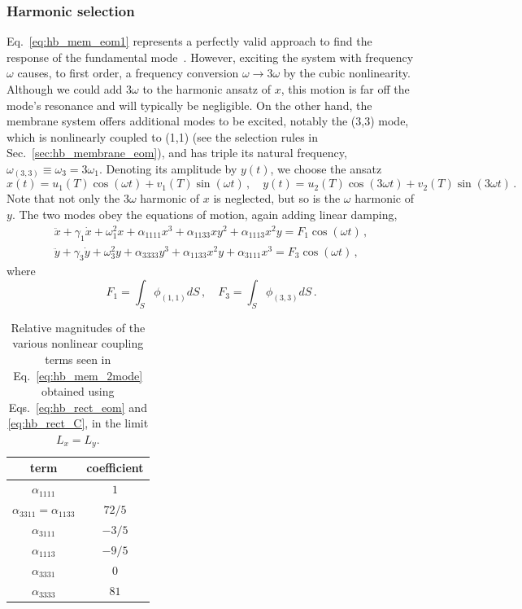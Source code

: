 \subsubsection{Harmonic selection}

Eq.~\eqref{eq:hb_mem_eom1} represents a perfectly valid approach to find the response of the fundamental mode~\cite{Steeneken_2021, Miller_2021}. However, exciting the system with frequency $\omega$ causes, to first order, a frequency conversion $\omega \rightarrow 3\omega$ by the cubic nonlinearity. Although we could add $3\omega $ to the harmonic ansatz of $x$, this motion is far off the mode's resonance and will typically be negligible. On the other hand, the membrane system offers additional modes to be excited, notably the (3,3) mode, which is nonlinearly coupled to (1,1) (see the selection rules in Sec.~\ref{sec:hb_membrane_eom}), and has triple its natural frequency, $\omega_{(3,3)} \equiv \omega_3 = 3 \omega_1$. Denoting its amplitude by $y(t)$, we choose the ansatz
\begin{equation} \label{eq:hb_1133_ansatz}
x(t) = u_1(T) \cos(\omega t) + v_1(T) \sin(\omega t) \,, \quad y(t) = u_2(T) \cos(3\omega t) + v_2(T) \sin(3\omega t) \,.
\end{equation}
Note that not only the $3\omega$ harmonic of $x$ is neglected, but so is the $\omega$ harmonic of $y$. The two modes obey the equations of motion, again adding linear damping,
\begin{equation} \label{eq:hb_mem_2mode}
\begin{gathered}
\ddot{x} + \gamma_1 \dot{x} + \omega_1^2 x + \alpha_{1111} x^3 + \alpha_{1133} x y^2 + \alpha_{1113} x^2 y = F_1 \cos(\omega t)\,, \\
\ddot{y} + \gamma_3 \dot{y} + \omega_3^2 y + \alpha_{3333} y^3 + \alpha_{1133} x^2 y + \alpha_{3111} x^3 = F_3 \cos(\omega t)\,,
\end{gathered} 
\end{equation}
where
\begin{equation}
F_1 = \int_S \phi_{(1,1)} dS\,, \quad F_3 = \int_S \phi_{(3,3)} dS \,.
\end{equation}
\begin{table}[ht] 
	\centering
	\caption{Relative magnitudes of the various nonlinear coupling terms seen in Eq.~\eqref{eq:hb_mem_2mode} obtained using Eqs.~\eqref{eq:hb_rect_eom} and \eqref{eq:hb_rect_C}, in the limit $L_x = L_y$.}
	\label{table:hb_rect_coeffs}
	\begin{tabular}{ |c|c| } 
		\hline
		term & coefficient \\ \hline
		$\alpha_{1111}$	& $1$ \\
		$\alpha_{3311} = \alpha_{1133}$ & $72/5$\\ 
		$\alpha_{3111}$ & $-3/5$ \\
		$\alpha_{1113}$ & $-9/5$ \\
		$\alpha_{3331}$ & $0$\\
		$\alpha_{3333}$ & $81$ \\ \hline
	\end{tabular}
\end{table}
